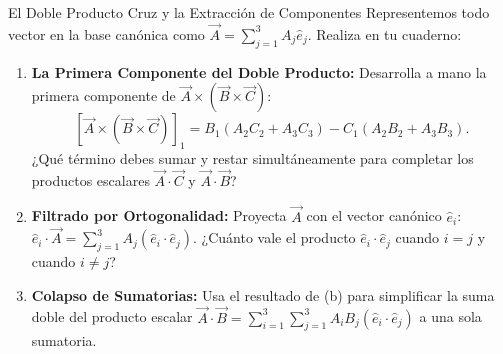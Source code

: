 \documentclass[10pt,aspectratio=169]{beamer}
\begin{document}
\begin{frame}{El Doble Producto Cruz y la Extracción de Componentes}
  \vspace{0.05cm}
  Representemos todo vector en la base canónica como $\vec{A} = \sum_{j=1}^3 A_j\hat{e}_j$. Realiza en tu cuaderno:
  \vspace{0.25cm}
  \begin{enumerate}\itemsep10pt
    \item[(a)] \textbf{La Primera Componente del Doble Producto:} Desarrolla a mano la primera componente de $\vec{A} \times (\vec{B} \times \vec{C})$:
    \[
    [\vec{A} \times (\vec{B} \times \vec{C})]_1 = B_1(A_2 C_2 + A_3 C_3) - C_1(A_2 B_2 + A_3 B_3).
    \]
    ¿Qué término debes sumar y restar simultáneamente para completar los productos escalares $\vec{A}\cdot\vec{C}$ y $\vec{A}\cdot\vec{B}$?
    \item[(b)] \textbf{Filtrado por Ortogonalidad:} Proyecta $\vec{A}$ con el vector canónico $\hat{e}_i$: $\hat{e}_i \cdot \vec{A} = \sum_{j=1}^3 A_j (\hat{e}_i \cdot \hat{e}_j)$. ¿Cuánto vale el producto $\hat{e}_i \cdot \hat{e}_j$ cuando $i = j$ y cuando $i \neq j$?
    \item[(c)] \textbf{Colapso de Sumatorias:} Usa el resultado de (b) para simplificar la suma doble del producto escalar $\vec{A}\cdot\vec{B} = \sum_{i=1}^3 \sum_{j=1}^3 A_i B_j (\hat{e}_i \cdot \hat{e}_j)$ a una sola sumatoria.
  \end{enumerate}
\end{frame}
\end{document}

